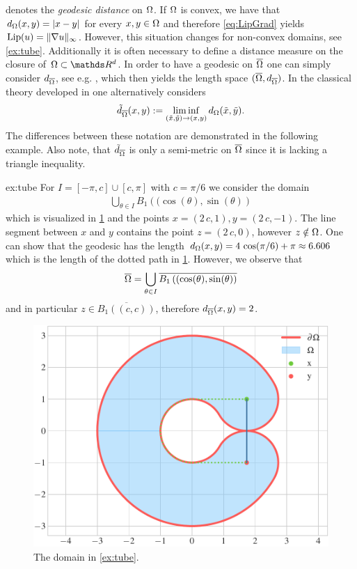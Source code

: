 %
denotes the \emph{geodesic distance} on $\Omega$. If $\Omega$ is convex, we have that $d_\Omega(x,y) = \left|x-y\right|$ for every 
$x,y\in \Omega$ and therefore \cref{eq:LipGrad} yields $\operatorname{Lip}(u) = \|\nabla u\|_\infty$. However, this situation changes for non-convex domains, see \cref{ex:tube}. Additionally it is often necessary to define 
a distance measure on the closure of $\domain\subset\R^d$. In order to have a geodesic on $\overline{\Omega}$ one can simply consider $d_{\overline{\Omega}}$, see e.g. \cite{unif}, which then yields the length space $(\overline{\Omega}, d_{\overline{\Omega}})$. In the classical theory developed in \cite{jensen1993uniqueness} one alternatively considers
%
\begin{align*}
\tilde{d}_{\overline{\Omega}}(x,y) := \liminf_{(\tilde x,\tilde y)\to(x,y)} d_\Omega(\tilde{x},\tilde{y}).
\end{align*}
%
The differences between these notation are demonstrated in the following example. Also note, that 
$\tilde{d}_{\overline{\Omega}}$ is only a semi-metric on $\overline{\Omega}$ since it is lacking a 
triangle inequality.
%
\begin{example}{}{ex:tube}
For $I = [-\pi, c]\cup [c, \pi]$ with $c=\pi/6$ we consider the domain
%
\begin{align*}
\bigcup_{\theta \in I} B_1\left((\cos(\theta),\sin(\theta)\right)
\end{align*}
%
which is visualized in \cref{fig:tube} and the points $x=(2\, c, 1), y= (2\, c, -1)$. The 
line segment between $x$ and $y$ contains the point $z=(2\, c, 0)$, however $z\notin \Omega$. One can show that 
the geodesic has the length $d_\Omega(x,y) = 4\, \cos(\pi/6) + \pi \approx 6.606$ which is the length of the dotted path 
in \cref{fig:tube}. However, we observe that 
%
\begin{align*}
\overline{\Omega} = \bigcup_{\theta \in I } 
\overline{B_1\left((\cos(\theta),\sin(\theta)\right)}
\end{align*}
%
and in particular $z\in \overline{B_1\left((c,c)\right)}$, therefore $d_{\overline{\Omega}}(x,y) = 2$.
\end{example}
%
\begin{figure}
\centering
\includegraphics[width=.5\textwidth]{code/domains/tube.pdf}
\caption{The domain in \cref{ex:tube}.}\label{fig:tube}
\end{figure}
%
%
